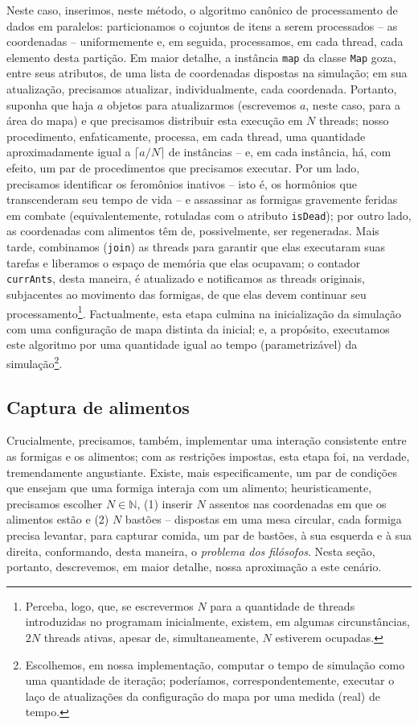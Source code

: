 \documentclass[12pt]{article}
\theoremstyle{definition}
\begin{document}
Neste caso, inserimos, neste método, o algoritmo canônico de processamento de dados em paralelos: particionamos o cojuntos de itens a serem processados -- as coordenadas -- uniformemente e, em seguida, processamos, em cada thread, cada elemento desta partição. Em maior detalhe, a instância \texttt{map} da classe \texttt{Map} goza, entre seus atributos, de uma lista de coordenadas dispostas na simulação; em sua atualização, precisamos atualizar, individualmente, cada coordenada. Portanto, suponha que haja $a$ objetos para atualizarmos (escrevemos $a$, neste caso, para a área do mapa) e que precisamos distribuir esta execução em $N$ threads; nosso procedimento, enfaticamente, processa, em cada thread, uma quantidade aproximadamente igual a $\lceil a/N \rceil$ de instâncias -- e, em cada instância, há, com efeito, um par de procedimentos que precisamos executar. Por um lado, precisamos identificar os feromônios inativos -- isto é, os hormônios que transcenderam seu tempo de vida -- e assassinar as formigas gravemente feridas em combate (equivalentemente, rotuladas com o atributo \texttt{isDead}); por outro lado, as coordenadas com alimentos têm de, possivelmente, ser regeneradas. Mais tarde, combinamos (\texttt{join}) as threads para garantir que elas executaram suas tarefas e liberamos o espaço de memória que elas ocupavam; o contador \texttt{currAnts}, desta maneira, é atualizado e notificamos as threads originais, subjacentes ao movimento das formigas, de que elas devem continuar seu processamento\footnote{Perceba, logo, que, se escrevermos $N$ para a quantidade de threads introduzidas no programam inicialmente, existem, em algumas circunstâncias, $2N$ threads ativas, apesar de, simultaneamente, $N$ estiverem ocupadas.}. Factualmente, esta etapa culmina na inicialização da simulação com uma configuração de mapa distinta da inicial; e, a propósito, executamos este algoritmo por uma quantidade igual ao tempo (parametrizável) da simulação\footnote{Escolhemos, em nossa implementação, computar o tempo de simulação como uma quantidade de iteração; poderíamos, correspondentemente, executar o laço de atualizações da configuração do mapa por uma medida (real) de tempo.}.  

\subsection{Captura de alimentos} 

Crucialmente, precisamos, também, implementar uma interação consistente entre as formigas e os alimentos; com as restrições impostas, esta etapa foi, na verdade, tremendamente angustiante. Existe, mais especificamente, um par de condições que ensejam que uma formiga interaja com um alimento; heuristicamente, precisamos escolher $N \in \mathbb{N}$, (1) inserir $N$ assentos nas coordenadas em que os alimentos estão e (2) $N$ bastões -- dispostas em uma mesa circular, cada formiga precisa levantar, para capturar comida, um par de bastões, à sua esquerda e à sua direita, conformando, desta maneira, o \textit{problema dos filósofos}. Nesta seção, portanto, descrevemos, em maior detalhe, nossa aproximação a este cenário. 
\end{document}
